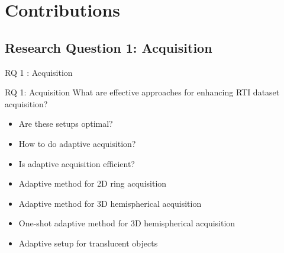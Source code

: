 \documentclass{beamer}
\begin{document}

\section[Contributions]{Contributions}

\subsection[RQ 1]{Research Question 1: \color{green!70!black}Acquisition}


\begin{frame}[t]{RQ 1 : Acquisition}

\begin{alertblock}{RQ 1: Acquisition}
What are effective approaches for enhancing RTI dataset acquisition?
\end{alertblock}


\begin{itemize}
    \item<1-> Are these setups optimal?
    \item<2-> How to do adaptive acquisition?
    \item<3-> Is adaptive acquisition efficient?
\end{itemize}

\begin{itemize}
    \item<5-> Adaptive method for 2D ring acquisition
    \item<6-> Adaptive method for 3D hemispherical acquisition
    \item<7-> One-shot adaptive method for 3D hemispherical acquisition
    \item<8-> Adaptive setup for translucent objects
\end{itemize}

\end{frame}
\end{document}
